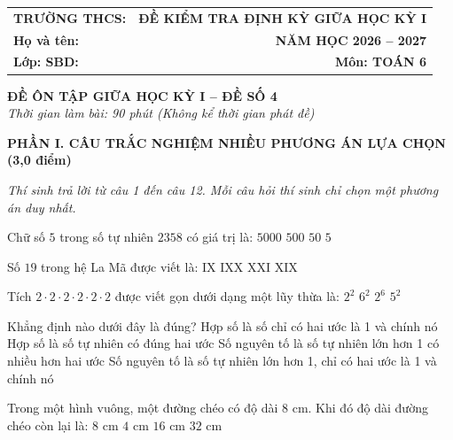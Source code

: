 \documentclass[12pt,a4paper]{article}
\begin{document}
\noindent
\begin{tabularx}{\linewidth}{X r}
\textbf{TRƯỜNG THCS: \dotfill} & \textbf{ĐỀ KIỂM TRA ĐỊNH KỲ GIỮA HỌC KỲ I} \\
\textbf{Họ và tên: \dotfill} & \textbf{NĂM HỌC 2026 -- 2027} \\
\textbf{Lớp: \dotfill \quad SBD: \dotfill} & \textbf{Môn: TOÁN 6} \\
\hline
\end{tabularx}
\vspace{2mm}

\begin{center}
  \textbf{\large ĐỀ ÔN TẬP GIỮA HỌC KỲ I -- ĐỀ SỐ 4}\\
  \textit{Thời gian làm bài: 90 phút (Không kể thời gian phát đề)}
\end{center}
\vspace{1mm}

\noindent\textbf{\large PHẦN I. CÂU TRẮC NGHIỆM NHIỀU PHƯƠNG ÁN LỰA CHỌN (3,0 điểm)}

\textit{Thí sinh trả lời từ câu 1 đến câu 12. Mỗi câu hỏi thí sinh chỉ chọn một phương án duy nhất.}

\vspace{1mm}
\begin{ex}
Chữ số $5$ trong số tự nhiên $2358$ có giá trị là:
\choice
{$5000$}
{$500$}
{\True $50$}
{$5$}
\end{ex}

\begin{ex}
Số $19$ trong hệ La Mã được viết là:
\choice
{IX}
{IXX}
{XXI}
{\True XIX}
\end{ex}

\begin{ex}
Tích $2 \cdot 2 \cdot 2 \cdot 2 \cdot 2 \cdot 2$ được viết gọn dưới dạng một lũy thừa là:
\choice
{$2^2$}
{$6^2$}
{\True $2^6$}
{$5^2$}
\end{ex}

\begin{ex}
Khẳng định nào dưới đây là đúng?
\choice
{Hợp số là số chỉ có hai ước là 1 và chính nó}
{Hợp số là số tự nhiên có đúng hai ước}
{Số nguyên tố là số tự nhiên lớn hơn 1 có nhiều hơn hai ước}
{\True Số nguyên tố là số tự nhiên lớn hơn 1, chỉ có hai ước là 1 và chính nó}
\end{ex}

\begin{ex}
Trong một hình vuông, một đường chéo có độ dài $8\text{ cm}$. Khi đó độ dài đường chéo còn lại là:
\choice
{\True $8\text{ cm}$}
{$4\text{ cm}$}
{$16\text{ cm}$}
{$32\text{ cm}$}
\end{ex}
\end{document}
